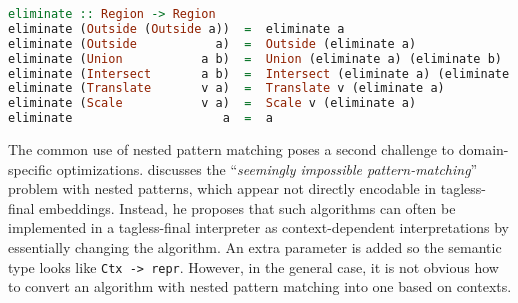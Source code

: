 \begin{lstlisting}[language=Haskell]
eliminate :: Region -> Region
eliminate (Outside (Outside a))  =  eliminate a
eliminate (Outside           a)  =  Outside (eliminate a)
eliminate (Union           a b)  =  Union (eliminate a) (eliminate b)
eliminate (Intersect       a b)  =  Intersect (eliminate a) (eliminate b)
eliminate (Translate       v a)  =  Translate v (eliminate a)
eliminate (Scale           v a)  =  Scale v (eliminate a)
eliminate                     a  =  a
\end{lstlisting}

\noindent
The common use of nested pattern matching poses a second challenge to
domain-specific optimizations. \citet{kiselyov2010typed} discusses the
``\emph{seemingly impossible pattern-matching}'' problem with nested patterns,
which appear not directly encodable in tagless-final embeddings. Instead, he
proposes that such algorithms can often be implemented in a tagless-final
interpreter as context-dependent interpretations by essentially changing the
algorithm. An extra parameter is added so the semantic type looks like
\lstinline{Ctx -> repr}. However, in the general case, it is not obvious how to
convert an algorithm with nested pattern matching into one based on contexts. 
